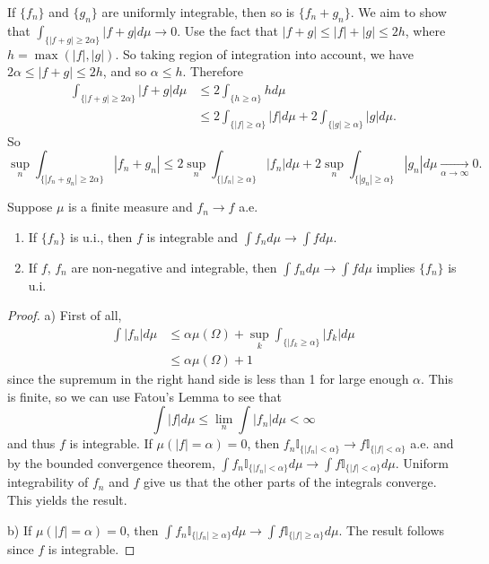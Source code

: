 \documentclass[11pt,fleqn]{book} %
\begin{document}
If $\{f_n\}$ and $\{g_n\}$ are uniformly integrable, then so is $\{f_n + g_n\}$. We aim to show that $\int_{\{|f+g| \geq 2\alpha\}} |f+g| d\mu \to 0$. Use the fact that $|f+g| \leq |f|+|g| \leq 2h$, where $h = \max(|f|,|g|)$. So taking region of integration into account, we have $2\alpha \leq |f+g| \leq 2h$, and so $\alpha \leq h$. Therefore
\begin{align*}
	\int_{\{|f+g| \geq 2\alpha\}} |f+g| d\mu &\leq 2 \int_{\{h \geq \alpha\}} h d\mu \\
	&\leq 2 \int_{\{|f| \geq \alpha\}} |f| d\mu + 2 \int_{\{|g| \geq \alpha\}} |g| d\mu.
\end{align*}
So
\[
	\sup_n \int_{\{|f_n+g_n| \geq 2\alpha\}} |f_n+g_n| \leq 2 \sup_n \int_{\{|f_n| \geq \alpha\}} |f_n| d\mu + 2 \sup_n \int_{\{|g_n| \geq \alpha\}} |g_n| d\mu \xrightarrow[\alpha \to \infty]{} 0.
\]

\begin{theorem}
	Suppose $\mu$ is a finite measure and $f_n \to f$ a.e.
	\begin{enumerate}[label=\alph*)]
		\item If $\{f_n\}$ is u.i., then $f$ is integrable and $\int f_n d\mu \to \int f d\mu$.
		\item If $f$, $f_n$ are non-negative and integrable, then $\int f_n d\mu \to \int f d\mu$ implies $\{f_n\}$ is u.i.
	\end{enumerate}
\end{theorem}

\begin{proof}
	a) First of all,
	\begin{align*}
		\int |f_n| d\mu &\leq \alpha \mu(\Omega) + \sup_k \int_{\{|f_k \geq \alpha\}} |f_k| d\mu \\
		&\leq \alpha \mu(\Omega) + 1
	\end{align*}
	since the supremum in the right hand side is less than 1 for large enough $\alpha$. This is finite, so we can use Fatou's Lemma to see that
	\[
		\int |f| d\mu \leq \lim_n \int |f_n| d\mu < \infty
	\]
	and thus $f$ is integrable. If $\mu(|f|=\alpha) = 0$, then $f_n\mathbb{I}_{\{|f_n| < \alpha\}} \to f\mathbb{I}_{\{|f| < \alpha\}}$ a.e. and by the bounded convergence theorem, $\int f_n\mathbb{I}_{\{|f_n| < \alpha\}} d\mu \to \int f\mathbb{I}_{\{|f| < \alpha\}} d\mu$. Uniform integrability of $f_n$ and $f$ give us that the other parts of the integrals converge. This yields the result.

	b) If $\mu(|f|=\alpha)=0$, then $\int f_n\mathbb{I}_{\{|f_n| \geq \alpha\}} d\mu \to \int f\mathbb{I}_{\{|f| \geq \alpha\}} d\mu$. The result follows since $f$ is integrable.
\end{proof}
\end{document}
